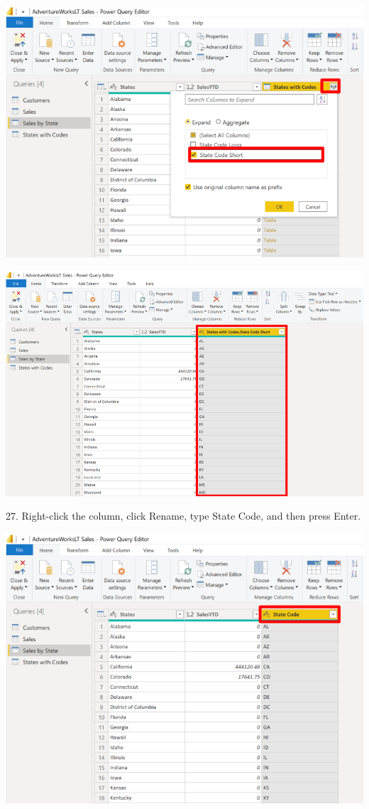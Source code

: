 \documentclass[12pt,letterpaper]{article}
\begin{document}
\begin{center}
    \includegraphics[width=14cm]{img/66.png}  
\end{center}
\begin{center}
    \includegraphics[width=17cm]{img/67.png}
    \vspace{2cm}   
\end{center}
27. Right-click the column, click Rename, type State Code, and then press Enter.
\begin{center}
    \includegraphics[width=14cm]{img/68.png}  
\end{center}
\end{document}

